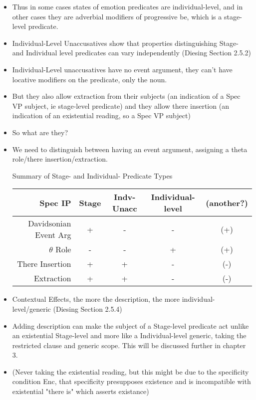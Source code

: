\documentclass[landscape]{article}
\begin{document}
\begin{itemize}
\item Thus in some cases states of emotion predicates are individual-level, and in other cases they are adverbial modifiers of progressive be, which is a stage-level predicate.

\item Individual-Level Unaccusatives show that properties distinguishing Stage- and Individual level predicates can vary independently (Diesing Section 2.5.2)

\item Individual-Level unaccusatives have no event argument, they can't have locative modifiers on the predicate, only the noun.

\item But they also allow extraction from their subjects (an indication of a Spec VP subject, ie stage-level predicate) and they allow there insertion (an indication of an existential reading, so a Spec VP  subject)

\item So what are they?

\item We need to distinguish between having an event argument, assigning a theta role/there insertion/extraction.

\begin{example}Summary of Stage- and Individual- Predicate Types
\begin{tabular}{|r||c|c|c|c|}\hline
Spec IP& Stage & Indv-Unacc & Individual-level& (another?)\\\hline\hline
Davidsonian Event Arg & + & - & - & (+)\\\hline
$\theta$ Role & - & - & + & (+)\\
There Insertion & + & + & - & (-)\\ 
Extraction & + & + & -& (-)\\\hline
\end{tabular}
\end{example}

\item 
Contextual Effects, the more the description, the more individual-level/generic (Diesing Section 2.5.4)

\item
Adding description can make the subject of a Stage-level predicate act unlike an existential Stage-level and more like a Individual-level generic, taking the restricted clause and generic scope. This will be discussed further in chapter 3.

\item
(Never taking the existential reading, but this might be due to the specificity condition Enc, that specificity presupposes existence and is incompatible with existential "there is" which asserts existance)

\end{itemize}
\end{document}
